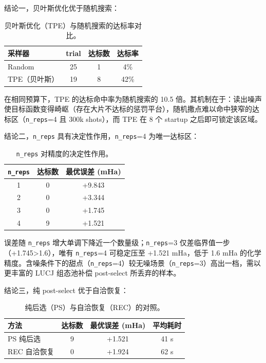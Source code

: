 \documentclass[UTF8,12pt,a4paper]{ctexart}
\begin{document}
结论一，贝叶斯优化优于随机搜索：

\begin{table}[H]
\centering
\caption{贝叶斯优化（TPE）与随机搜索的达标率对比。}
\begin{tabular}{lccc}
\toprule
采样器 & trial & 达标数 & 达标率 \\
\midrule
Random & 25 & 1 & 4\% \\
TPE（贝叶斯） & 19 & 8 & 42\% \\
\bottomrule
\end{tabular}
\end{table}

在相同预算下，TPE 的达标命中率为随机搜索的 10.5 倍。其机制在于：读出噪声使目标函数变得崎岖（存在大片不达标的惩罚平台），随机撒点难以命中狭窄的达标区（\texttt{n\_reps}=4 且 300k shots），而 TPE 在 8 个 startup 之后即可锁定该区域。

结论二，\texttt{n\_reps} 具有决定性作用，\texttt{n\_reps}=4 为唯一达标区：

\begin{table}[H]
\centering
\caption{\texttt{n\_reps} 对精度的决定性作用。}
\begin{tabular}{ccc}
\toprule
\texttt{n\_reps} & 达标数 & 最优误差 (mHa) \\
\midrule
1 & 0 & +9.843 \\
2 & 0 & +3.344 \\
3 & 0 & +1.745 \\
4 & 9 & +1.521 \\
\bottomrule
\end{tabular}
\end{table}

误差随 \texttt{n\_reps} 增大单调下降近一个数量级；\texttt{n\_reps}=3 仅差临界值一步（+1.745>1.6），唯有 \texttt{n\_reps}=4 可稳定压至 +1.521 mHa，低于 1.6 mHa 的化学精度。含噪条件下的甜点（\texttt{n\_reps}=4）较无噪场景（\texttt{n\_reps}=3）高出一档，需以更丰富的 LUCJ 组态池补偿 post-select 所丢弃的样本。

结论三，纯 post-select 优于自洽恢复：

\begin{table}[H]
\centering
\caption{纯后选（PS）与自洽恢复（REC）的对照。}
\begin{tabular}{lccc}
\toprule
方法 & 达标数 & 最优误差 (mHa) & 平均耗时 \\
\midrule
PS 纯后选 & 9 & +1.521 & 41 s \\
REC 自洽恢复 & 0 & +1.924 & 62 s \\
\bottomrule
\end{tabular}
\end{table}
\end{document}

